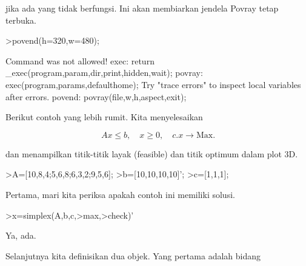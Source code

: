 \documentclass[a4paper,10pt]{article}
\begin{document}
\begin{eulernotebook}
\begin{eulercomment}
jika ada yang tidak berfungsi. Ini akan membiarkan jendela Povray tetap terbuka.
\end{eulercomment}
\begin{eulerprompt}
>povend(h=320,w=480);
\end{eulerprompt}
\begin{euleroutput}
  Command was not allowed!
  exec:
      return _exec(program,param,dir,print,hidden,wait);
  povray:
      exec(program,params,defaulthome);
  Try "trace errors" to inspect local variables after errors.
  povend:
      povray(file,w,h,aspect,exit); 
\end{euleroutput}
\begin{eulercomment}
Berikut contoh yang lebih rumit. Kita menyelesaikan

\end{eulercomment}
\begin{eulerformula}
\[
Ax \le b, \quad x \ge 0, \quad c.x \to \text{Max.}
\]
\end{eulerformula}
\begin{eulercomment}
dan menampilkan titik-titik layak (feasible) dan titik optimum dalam plot 3D.
\end{eulercomment}
\begin{eulerprompt}
>A=[10,8,4;5,6,8;6,3,2;9,5,6];
>b=[10,10,10,10]';
>c=[1,1,1];
\end{eulerprompt}
\begin{eulercomment}
Pertama, mari kita periksa apakah contoh ini memiliki solusi.
\end{eulercomment}
\begin{eulerprompt}
>x=simplex(A,b,c,>max,>check)'
\end{eulerprompt}
\begin{euleroutput}
  [0,  1,  0.5]
\end{euleroutput}
\begin{eulercomment}
Ya, ada.

Selanjutnya kita definisikan dua objek. Yang pertama adalah bidang


\end{eulercomment}
\end{eulernotebook}
\end{document}
